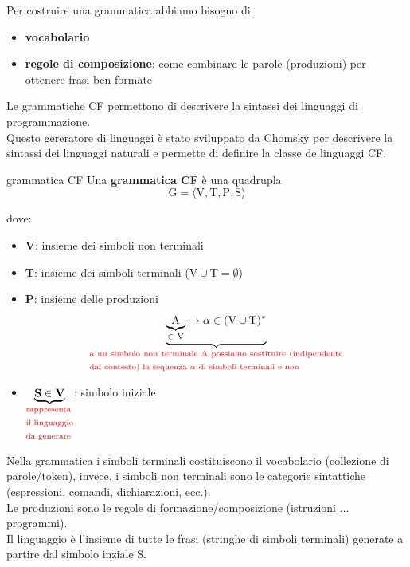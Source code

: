 Per costruire una grammatica abbiamo bisogno di:
\begin{itemize}[label=$\circ$, itemsep=\smallskipamount]
    \item \textbf{vocabolario}
    \item \textbf{regole di composizione}: come combinare le parole (produzioni) per ottenere frasi ben formate
\end{itemize}

\bigskip
Le grammatiche CF permettono di descrivere la sintassi dei linguaggi di programmazione.\\[0.2ex]
Questo gereratore di linguaggi è stato sviluppato da Chomsky per descrivere la sintassi dei linguaggi naturali e permette di definire la classe de linguaggi CF.

\begin{mydef}{grammatica CF}
    Una \textbf{grammatica CF} è una quadrupla
    \[
        \mathrm{G = \langle V, T, P, S \rangle}
    \]

    dove:
    \begin{itemize}[label=$\diamond$, itemsep=\smallskipamount]
        \item \textbf{V}: insieme dei simboli non terminali
        \item \textbf{T}: insieme dei simboli terminali ($\mathrm{V \cup T} = \emptyset$)
        \item \textbf{P}: insieme delle produzioni
        \[
            \underbrace{\underbrace{\mathrm{A}}_{\mathrm{\in \ V}} \rightarrow \alpha \in (\mathrm{V \cup T})^*}_{\text{\parbox{8cm}{\textcolor{red}{a un simbolo non terminale A possiamo sostituire (indipendente dal contesto) la sequenza $\alpha$ di simboli terminali e non}}}}
        \]
        \item $\underbrace{\mathbf{S \in V}}_{\text{\parbox{1.5cm}{\textcolor{red}{rappresenta il linguaggio da generare}}}}$: simbolo iniziale
    \end{itemize}
\end{mydef}

Nella grammatica i simboli terminali costituiscono il vocabolario (collezione di parole/token), invece, i simboli non terminali sono le categorie sintattiche (espressioni, comandi, dichiarazioni, ecc.).\\[0.2ex]
Le produzioni sono le regole di formazione/composizione (istruzioni $\dots$ programmi).\\[0.2ex]
Il linguaggio è l'insieme di tutte le frasi (stringhe di simboli terminali) generate a partire dal simbolo inziale $\mathrm{S}$.

